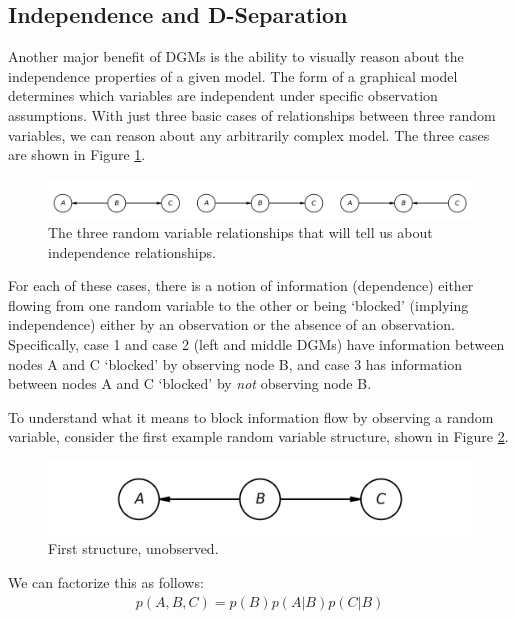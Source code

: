 \subsection{Independence and D-Separation}
Another major benefit of DGMs is the ability to visually reason about the independence properties of a given model. The form of a graphical model determines which variables are independent under specific observation assumptions. With just three basic cases of relationships between three random variables, we can reason about any arbitrarily complex model. The three cases are shown in Figure \ref{fig:indep-structure}.
\begin{figure}
	\centering
	\includegraphics[width=0.75\paperwidth]{../GraphicalModels/fig/indep-structure.png}
    \caption{The three random variable relationships that will tell us about independence relationships.}
	\label{fig:indep-structure}
\end{figure}
For each of these cases, there is a notion of information (dependence) either flowing from one random variable to the other or being `blocked' (implying independence) either by an observation or the absence of an observation. Specifically, case 1 and case 2 (left and middle DGMs) have information between nodes A and C `blocked' by observing node B, and case 3 has information between nodes A and C `blocked' by \textit{not} observing node B.

To understand what it means to block information flow by observing a random variable, consider the first example random variable structure, shown in Figure \ref{fig:first-case-unobserved}.

\begin{figure}
	\centering
	\includegraphics[width=0.5\paperwidth]{../GraphicalModels/fig/first-case-unobserved.png}
	\caption{First structure, unobserved.}
	\label{fig:first-case-unobserved}
\end{figure}

We can factorize this as follows:
\begin{align*}
	p(A, B, C) = p(B) p(A | B) p(C | B)
\end{align*}

